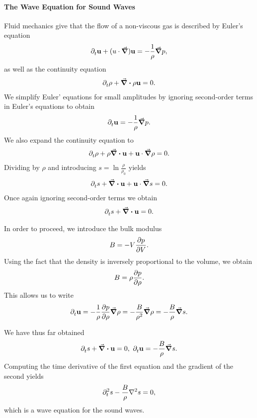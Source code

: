 \paragraph{The Wave Equation for Sound Waves}
Fluid mechanics give that the flow of a non-viscous gas is described by Euler's equation
\begin{align*}
	\partial_{t}^{}\vb{u} + (u\cdot\grad)\vb{u} = -\frac{1}{\rho}\grad{p},
\end{align*}
as well as the continuity equation
\begin{align*}
	\partial_{t}^{}\rho + \div{\rho\vb{u}} = 0.
\end{align*}
We simplify Euler' equations for small amplitudes by ignoring second-order terms in Euler's equations to obtain
\begin{align*}
	\partial_{t}^{}\vb{u} = -\frac{1}{\rho}\grad{p}.
\end{align*}
We also expand the continuity equation to
\begin{align*}
	\partial_{t}^{}\rho + \rho\div{\vb{u}} + \vb{u}\cdot\grad{\rho} = 0.
\end{align*}
Dividing by $\rho$ and introducing $s = \ln{\frac{\rho}{\rho_{0}}}$ yields
\begin{align*}
	\partial_{t}^{}s + \div{\vb{u}} + \vb{u}\cdot\grad{s} = 0.
\end{align*}
Once again ignoring second-order terms we obtain
\begin{align*}
	\partial_{t}^{}s + \div{\vb{u}} = 0.
\end{align*}

In order to proceed, we introduce the bulk modulus
\begin{align*}
	B = -V\pdv{p}{V}.
\end{align*}
Using the fact that the density is inversely proportional to the volume, we obtain
\begin{align*}
	B = \rho\pdv{p}{\rho}.
\end{align*}
This allows us to write
\begin{align*}
	\partial_{t}^{}\vb{u} = -\frac{1}{\rho}\pdv{p}{\rho}\grad{\rho} = -\frac{B}{\rho^{2}}\grad{\rho} = -\frac{B}{\rho}\grad{s}.
\end{align*}

We have thus far obtained
\begin{align*}
	\partial_{t}^{}s + \div{\vb{u}} = 0,\ \partial_{t}^{}\vb{u} = -\frac{B}{\rho}\grad{s}.
\end{align*}
Computing the time derivative of the first equation and the gradient of the second yields
\begin{align*}
	\del[2]{t}{s} - \frac{B}{\rho}\laplacian{s} = 0,
\end{align*}
which is a wave equation for the sound waves.

